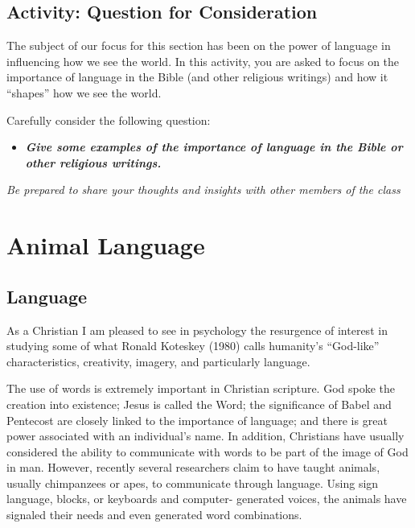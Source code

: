 \documentclass[
]{book}
\providecommand{\tightlist}{%
  \setlength{\itemsep}{0pt}\setlength{\parskip}{0pt}}
\begin{document}
\hypertarget{activity-question-for-consideration}{%
\subsection*{Activity: Question for Consideration}\label{activity-question-for-consideration}}

\begin{reflect}
The subject of our focus for this section has been on the power of language in influencing how we see the world. In this activity, you are asked to focus on the importance of language in the Bible (and other religious writings) and how it ``shapes'' how we see the world.

Carefully consider the following question:

\begin{itemize}
\tightlist
\item
  \textbf{\emph{Give some examples of the importance of language in the Bible or other religious writings.}}
\end{itemize}

\emph{Be prepared to share your thoughts and insights with other members of the class}
\end{reflect}

\hypertarget{animal-language}{%
\section{Animal Language}\label{animal-language}}

\hypertarget{language}{%
\subsection*{Language}\label{language}}

As a Christian I am pleased to see in psychology the resurgence of interest in studying some of what Ronald Koteskey (1980) calls humanity's ``God-like'' characteristics, creativity, imagery, and particularly language.

The use of words is extremely important in Christian scripture. God spoke the creation into existence; Jesus is called the Word; the significance of Babel and Pentecost are closely linked to the importance of language; and there is great power associated with an individual's name. In addition, Christians have usually considered the ability to communicate with words to be part of the image of God in man. However, recently several researchers claim to have taught animals, usually chimpanzees or apes, to communicate through language. Using sign language, blocks, or keyboards and computer- generated voices, the animals have signaled their needs and even generated word combinations.
\end{document}
